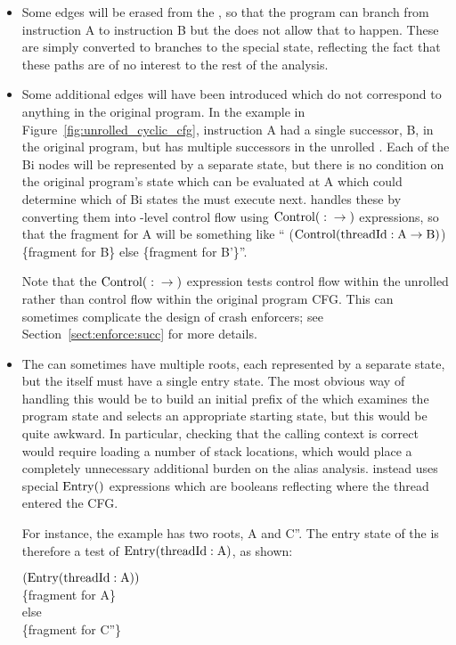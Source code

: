 \begin{itemize}
\item
  Some edges will be erased from the , so that the
  program can branch from instruction A to instruction B but the
   does not allow that to happen.  These are simply
  converted to branches to the special  state,
  reflecting the fact that these paths are of no interest to the rest
  of the analysis.

\item
  Some additional edges will have been introduced which do not
  correspond to anything in the original program.  In the example in
  Figure~\ref{fig:unrolled_cyclic_cfg}, instruction A had a single
  successor, B, in the original program, but has multiple successors
  in the unrolled .  Each of the Bi  nodes
  will be represented by a separate {\StateMachine} state, but there
  is no condition on the original program's state which can be
  evaluated at A which could determine which of Bi states the
  {\StateMachine} must execute next.  {\Technique} handles these by
  converting them into \StateMachine-level control flow using
  $\mathrm{Control}(\mathrm{}:\mathrm{} \rightarrow \mathrm{})$ expressions, so that the {\StateMachine}
  fragment for A will be something like ``
  ($\mathrm{Control}(\mathrm{threadId}:\mathrm{A} \rightarrow \mathrm{B})$) \{fragment for B\} else \{fragment
  for B'\}''.

  Note that the $\mathrm{Control}(\mathrm{}:\mathrm{} \rightarrow \mathrm{})$ expression tests control flow
  within the unrolled  rather than control flow within
  the original program CFG.  This can sometimes complicate the design
  of crash enforcers; see Section~\ref{sect:enforce:succ} for more
  details.

\item
  The  can sometimes have multiple roots, each
  represented by a separate {\StateMachine} state, but the
  {\StateMachine} itself must have a single entry state.  The most
  obvious way of handling this would be to build an initial prefix of
  the {\StateMachine} which examines the program state and selects an
  appropriate starting state, but this would be quite awkward.  In
  particular, checking that the calling context is correct would
  require loading a number of stack locations, which would place a
  completely unnecessary additional burden on the alias analysis.
  {\Technique} instead uses special $\mathrm{Entry}()$ expressions which
  are booleans reflecting where the thread entered the CFG.

  For instance, the example  has two roots, A and C''.
  The entry state of the {\StateMachine} is therefore a test
  of $\mathrm{Entry}(\mathrm{threadId}:\mathrm{A})$, as shown:

   $(\mathrm{Entry}(\mathrm{threadId}:\mathrm{A}))$ \\
  \{fragment for A\} \\
  else \\
  \{fragment for C''\}


\end{itemize}

